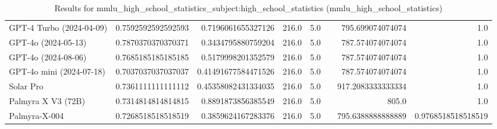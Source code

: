 \begin{table}[htp]
{\begin{tabular}{lrrrrrrr}
GPT-4 Turbo (2024-04-09) & 0.7592592592592593 & 0.7196061655327126 & 216.0 & 5.0 &  & 795.699074074074 & 1.0 \\
GPT-4o (2024-05-13) & 0.7870370370370371 & 0.3434795880759204 & 216.0 & 5.0 &  & 787.574074074074 & 1.0 \\
GPT-4o (2024-08-06) & 0.7685185185185185 & 0.5179998201352579 & 216.0 & 5.0 &  & 787.574074074074 & 1.0 \\
GPT-4o mini (2024-07-18) & 0.7037037037037037 & 0.41491677584471526 & 216.0 & 5.0 &  & 787.574074074074 & 1.0 \\
Solar Pro & 0.7361111111111112 & 0.45358082431334035 & 216.0 & 5.0 &  & 917.2083333333334 & 1.0 \\
Palmyra X V3 (72B) & 0.7314814814814815 & 0.8891873856385549 & 216.0 & 5.0 &  & 805.0 & 1.0 \\
Palmyra-X-004 & 0.7268518518518519 & 0.3859624167283376 & 216.0 & 5.0 &  & 795.6388888888889 & 0.9768518518518519 \\
\bottomrule
\end{tabular}}
\caption{Results for mmlu_high_school_statistics_subject:high_school_statistics (mmlu_high_school_statistics)}
\label{fig:mmlu_high_school_statistics_subject:high_school_statistics (mmlu_high_school_statistics)}
\end{table}